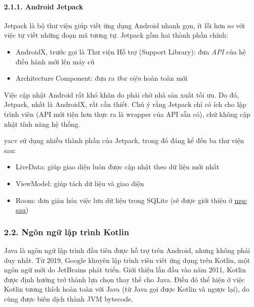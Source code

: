 \documentclass[
]{article}
\begin{document}
\hypertarget{android-jetpack}{%
\paragraph{\texorpdfstring{2.1.1. Android Jetpack
}{2.1.1. Android Jetpack }}\label{android-jetpack}}

Jetpack là bộ thư viện giúp viết ứng dụng Android nhanh gọn, ít lỗi hơn
so với việc tự viết những đoạn mã tương tự. Jetpack gồm hai thành phần
chính:

\begin{itemize}
\item
  AndroidX, trước gọi là Thư viện Hỗ trợ (Support Library): đưa
  \emph{API} của hệ điều hành mới lên máy cũ
\item
  Architecture Component: đưa ra \emph{thư viện} hoàn toàn mới
\end{itemize}

Việc cập nhật Android rất khó khăn do phải chờ nhà sản xuất tối ưu. Do
đó, Jetpack, nhất là AndroidX, rất cần thiết. Chú ý rằng Jetpack chỉ có
ích cho lập trình viên (API mới tiện hơn thực ra là wrapper của API sẵn
có), chứ không cập nhật tính năng hệ thống.

yacv sử dụng nhiều thành phần của Jetpack, trong đó đáng kể đến ba thư
viện sau:

\begin{itemize}
\item
  LiveData: giúp giao diện luôn được cập nhật theo dữ liệu mới nhất
\item
  ViewModel: giúp tách dữ liệu và giao diện
\item
  Room: đơn giản hóa việc lưu dữ liệu trong SQLite (sẽ được giới thiệu ở
  \protect\hyperlink{P2.4.2-room}{mục sau})
\end{itemize}

\hypertarget{nguxf4n-ngux1eef-lux1eadp-truxecnh-kotlin}{%
\subsubsection{\texorpdfstring{2.2. Ngôn ngữ lập trình Kotlin
}{2.2. Ngôn ngữ lập trình Kotlin }}\label{nguxf4n-ngux1eef-lux1eadp-truxecnh-kotlin}}

Java là ngôn ngữ lập trình đầu tiên được hỗ trợ trên Android, nhưng
không phải duy nhất. Từ 2019, Google khuyên lập trình viên viết ứng dụng
trên Kotlin, một ngôn ngữ mới do JetBrains phát triển. Giới thiệu lần
đầu vào năm 2011, Kotlin được định hướng trở thành lựa chọn thay thế cho
Java. Điều đó thể hiện ở việc Kotlin tương thích hoàn toàn với Java (từ
Java gọi được Kotlin và ngược lại), do cùng được biên dịch thành JVM
bytecode.
\end{document}
